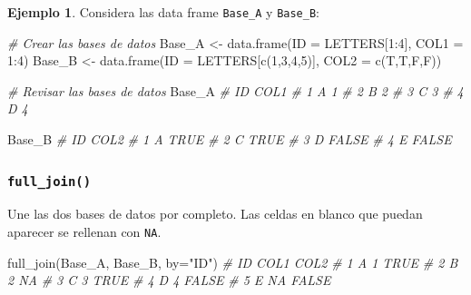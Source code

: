 \documentclass[
]{article}
\newenvironment{Shaded}{\begin{snugshade}}{\end{snugshade}}
\newcommand{\AttributeTok}[1]{\textcolor[rgb]{0.77,0.63,0.00}{#1}}
\newcommand{\CommentTok}[1]{\textcolor[rgb]{0.56,0.35,0.01}{\textit{#1}}}
\newcommand{\DecValTok}[1]{\textcolor[rgb]{0.00,0.00,0.81}{#1}}
\newcommand{\FunctionTok}[1]{\textcolor[rgb]{0.00,0.00,0.00}{#1}}
\newcommand{\NormalTok}[1]{#1}
\newcommand{\OtherTok}[1]{\textcolor[rgb]{0.56,0.35,0.01}{#1}}
\newcommand{\SpecialCharTok}[1]{\textcolor[rgb]{0.00,0.00,0.00}{#1}}
\newcommand{\StringTok}[1]{\textcolor[rgb]{0.31,0.60,0.02}{#1}}
\theoremstyle{definition}
\theoremstyle{definition}
\newtheorem{example}{Ejemplo}[section]
\theoremstyle{definition}
\theoremstyle{definition}
\theoremstyle{remark}
\begin{document}
\begin{example}

Considera las data frame \texttt{Base\_A} y \texttt{Base\_B}:

\begin{Shaded}
\begin{Highlighting}[]
\CommentTok{\# Crear las bases de datos}
\NormalTok{Base\_A }\OtherTok{\textless{}{-}} \FunctionTok{data.frame}\NormalTok{(}\AttributeTok{ID =}\NormalTok{ LETTERS[}\DecValTok{1}\SpecialCharTok{:}\DecValTok{4}\NormalTok{],}
                     \AttributeTok{COL1 =} \DecValTok{1}\SpecialCharTok{:}\DecValTok{4}\NormalTok{)}
\NormalTok{Base\_B }\OtherTok{\textless{}{-}} \FunctionTok{data.frame}\NormalTok{(}\AttributeTok{ID =}\NormalTok{ LETTERS[}\FunctionTok{c}\NormalTok{(}\DecValTok{1}\NormalTok{,}\DecValTok{3}\NormalTok{,}\DecValTok{4}\NormalTok{,}\DecValTok{5}\NormalTok{)],}
                     \AttributeTok{COL2 =} \FunctionTok{c}\NormalTok{(T,T,F,F))}

\CommentTok{\# Revisar las bases de datos}
\NormalTok{Base\_A}
\CommentTok{\#   ID COL1}
\CommentTok{\# 1  A    1}
\CommentTok{\# 2  B    2}
\CommentTok{\# 3  C    3}
\CommentTok{\# 4  D    4}

\NormalTok{Base\_B}
\CommentTok{\#   ID  COL2}
\CommentTok{\# 1  A  TRUE}
\CommentTok{\# 2  C  TRUE}
\CommentTok{\# 3  D FALSE}
\CommentTok{\# 4  E FALSE}
\end{Highlighting}
\end{Shaded}

\end{example}

\hypertarget{full_join}{%
\subsubsection{\texorpdfstring{\texttt{full\_join()}}{full\_join()}}\label{full_join}}

Une las dos bases de datos por completo. Las celdas en blanco que puedan aparecer se rellenan con \texttt{NA}.

\begin{Shaded}
\begin{Highlighting}[]
\FunctionTok{full\_join}\NormalTok{(Base\_A, Base\_B, }\AttributeTok{by=}\StringTok{"ID"}\NormalTok{)}
\CommentTok{\#   ID COL1  COL2}
\CommentTok{\# 1  A    1  TRUE}
\CommentTok{\# 2  B    2    NA}
\CommentTok{\# 3  C    3  TRUE}
\CommentTok{\# 4  D    4 FALSE}
\CommentTok{\# 5  E   NA FALSE}
\end{Highlighting}
\end{Shaded}
\end{document}

